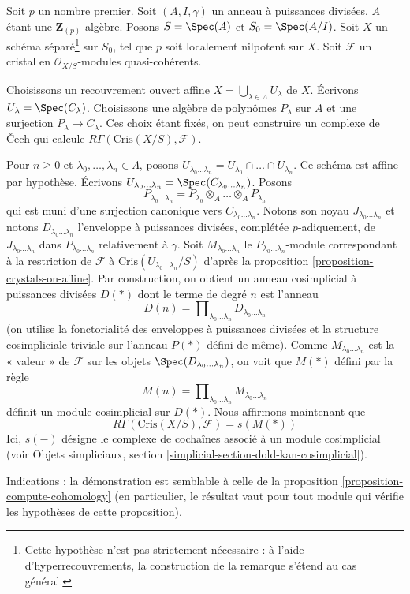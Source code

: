 \begin{remark}
\label{remark-cech-complex}
Soit $p$ un nombre premier. Soit $(A, I, \gamma)$ un anneau à puissances
divisées, $A$ étant une $\mathbf{Z}_{(p)}$-algèbre. Posons $S = \Spec(A)$ et
$S_0 = \Spec(A/I)$. Soit $X$ un schéma séparé\footnote{Cette hypothèse n'est
pas strictement nécessaire : à l'aide d'hyperrecouvrements, la construction de la
remarque s'étend au cas général.} sur
$S_0$, tel que $p$ soit localement nilpotent sur $X$. Soit $\mathcal{F}$ un
cristal en $\mathcal{O}_{X/S}$-modules quasi-cohérents.

\medskip\noindent
Choisissons un recouvrement ouvert affine
$X = \bigcup_{\lambda \in \Lambda} U_\lambda$ de $X$.
Écrivons $U_\lambda = \Spec(C_\lambda)$. Choisissons une algèbre de polynômes
$P_\lambda$ sur $A$ et une surjection $P_\lambda \to C_\lambda$.
Ces choix étant fixés, on peut construire un complexe de {\v C}ech qui
calcule $R\Gamma(\text{Cris}(X/S), \mathcal{F})$.

\medskip\noindent
Pour $n \geq 0$ et $\lambda_0, \ldots, \lambda_n \in \Lambda$,
posons $U_{\lambda_0 \ldots \lambda_n} = U_{\lambda_0} \cap \ldots
\cap U_{\lambda_n}$. Ce schéma est affine par hypothèse. Écrivons
$U_{\lambda_0 \ldots \lambda_n} = \Spec(C_{\lambda_0 \ldots \lambda_n})$.
Posons
$$
P_{\lambda_0 \ldots \lambda_n} =
P_{\lambda_0} \otimes_A \ldots \otimes_A P_{\lambda_n}
$$
qui est muni d'une surjection canonique vers $C_{\lambda_0 \ldots \lambda_n}$.
Notons son noyau $J_{\lambda_0 \ldots \lambda_n}$ et notons
$D_{\lambda_0 \ldots \lambda_n}$
l'enveloppe à puissances divisées, complétée $p$-adiquement, de
$J_{\lambda_0 \ldots \lambda_n}$ dans $P_{\lambda_0 \ldots \lambda_n}$
relativement à $\gamma$. Soit $M_{\lambda_0 \ldots \lambda_n}$ le
$P_{\lambda_0 \ldots \lambda_n}$-module correspondant
à la restriction de $\mathcal{F}$ à
$\text{Cris}(U_{\lambda_0 \ldots \lambda_n}/S)$ d'après
la proposition \ref{proposition-crystals-on-affine}.
Par construction, on obtient un anneau cosimplicial à puissances divisées $D(*)$
dont le terme de degré $n$ est l'anneau
$$
D(n) =
\prod\nolimits_{\lambda_0 \ldots \lambda_n}
D_{\lambda_0 \ldots \lambda_n}
$$
(on utilise la fonctorialité des enveloppes à puissances divisées et la structure
cosimpliciale triviale sur l'anneau $P(*)$ défini de même).
Comme $M_{\lambda_0 \ldots \lambda_n}$ est la « valeur » de $\mathcal{F}$
sur les objets $\Spec(D_{\lambda_0 \ldots \lambda_n})$, on voit que
$M(*)$ défini par la règle
$$
M(n) = \prod\nolimits_{\lambda_0 \ldots \lambda_n}
M_{\lambda_0 \ldots \lambda_n}
$$
définit un module cosimplicial sur $D(*)$. Nous affirmons maintenant que
$$
R\Gamma(\text{Cris}(X/S), \mathcal{F}) = s(M(*))
$$
Ici, $s(-)$ désigne le complexe de cochaînes associé à un module
cosimplicial (voir
Objets simpliciaux, section \ref{simplicial-section-dold-kan-cosimplicial}).

\medskip\noindent
Indications : la démonstration est semblable à celle de la
proposition \ref{proposition-compute-cohomology} (en particulier,
le résultat vaut pour tout module qui vérifie les hypothèses de
cette proposition).
\end{remark}

